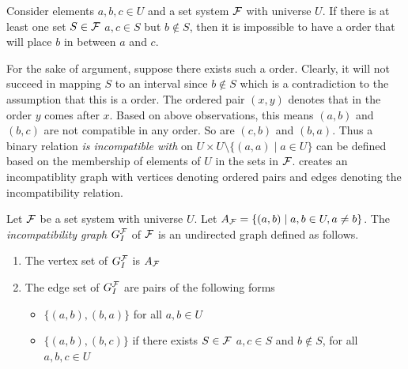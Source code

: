 \begin{observation} 
  Consider elements $a, b, c \in U$ and a set system ${\cal F}$ with
  universe $U$. If there is at least one set $S \in {\cal F}$ \stt $a, c
  \in S$ but $b \notin S$, then it is impossible to have a \COP order
  that will place $b$ in between $a$ and $c$. 
\end{observation}

For the sake of argument, suppose there exists such a \COP
order. Clearly, it will not succeed in mapping $S$ to an interval
since $b \notin S$ which is a contradiction to the assumption that
this is a \COP order.  The ordered pair $(x,y)$ denotes that in the
\COP order $y$ comes after $x$. Based on above observations, this
means $(a,b)$ and $(b,c)$ are not compatible in any \COP order. So are
$(c,b)$ and $(b,a)$.  Thus a binary relation {\em is incompatible
  with} on $U \times U \setminus \{(a,a) \mid a \in U\}$ can be
defined based on the membership of elements of $U$ in the sets in
${\cal F}$.  \cite{mcc04} creates an incompatiblity graph with vertices
denoting ordered pairs and edges denoting the incompatibility
relation.

\begin{definition}
  Let ${\cal F}$ be a set system with universe $U$. Let $A_{{\cal F}} = \{(a,b)
  \mid a, b \in U, a \ne b\}$. The {\em incompatibility graph}
  $G_I^{\cal F}$ of ${\cal F}$ is an undirected graph defined as follows.
  \begin{enumerate}
  \item   The vertex set of $G_I^{\cal F}$ is $ A_{{\cal F}}$
  \item  The edge set of $G_I^{\cal F}$ are pairs of the following forms
    \begin{itemize}
    \item $\{(a,b),(b,a)\}$ for all $a, b \in U$
    \item $\{(a,b),(b,c)\}$ if there exists $S \in {\cal F}$ \stt $a, c
      \in S$ and $b \notin S$, for all $a, b, c \in U$
    \end{itemize}
  \end{enumerate}
  \dstop
\end{definition}

